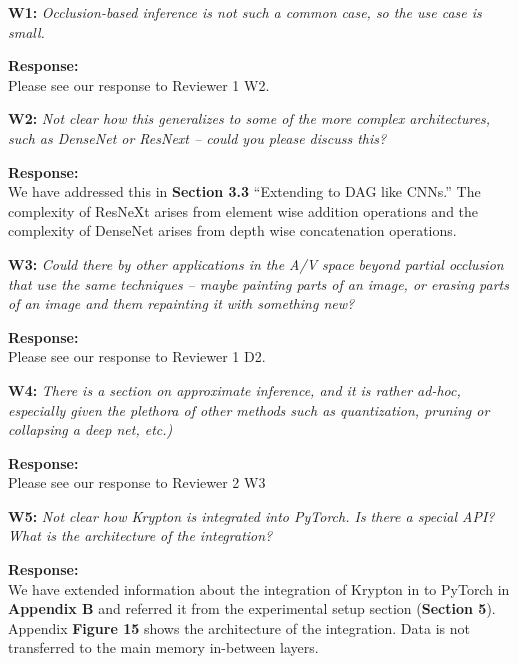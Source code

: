 \documentclass[preprint]{vldb}
\begin{document}
\vspace{2mm}
\noindent \textbf{W1:} \textit{Occlusion-based inference is not such a common case, so the use case is small.}

\vspace{2mm}
\noindent \textbf{Response:}\\
Please see our response to Reviewer 1 W2.

\vspace{2mm}
\noindent \textbf{W2:} \textit{Not clear how this generalizes to some of the more complex architectures, such as DenseNet or ResNext -- could you please discuss this?}

\vspace{2mm}
\noindent \textbf{Response:}\\
We have addressed this in \textbf{Section 3.3} ``Extending to DAG like CNNs.'' The complexity of ResNeXt arises from element wise addition operations and the complexity of DenseNet arises from depth wise concatenation operations.

\vspace{2mm}
\noindent \textbf{W3:} \textit{Could there by other applications in the A/V space beyond partial occlusion that use the same techniques -- maybe painting parts of an image, or erasing parts of an image and them repainting it with something new?}

\vspace{2mm}
\noindent \textbf{Response:}\\
Please see our response to Reviewer 1 D2.

\vspace{2mm}
\noindent \textbf{W4:} \textit{There is a section on approximate inference, and it is rather ad-hoc, especially given the plethora of other methods such as quantization, pruning or collapsing a deep net, etc.)}

\vspace{2mm}
\noindent \textbf{Response:}\\
Please see our response to Reviewer 2 W3

\vspace{2mm}
\noindent \textbf{W5:} \textit{Not clear how Krypton is integrated into PyTorch. Is there a special API? What is the architecture of the integration?}

\vspace{2mm}
\noindent \textbf{Response:}\\
We have extended information about the integration of Krypton in to PyTorch in \textbf{Appendix B} and referred it from the experimental setup section (\textbf{Section 5}). Appendix \textbf{Figure 15} shows the architecture of the integration. Data is not transferred to the main memory in-between layers.
\end{document}
